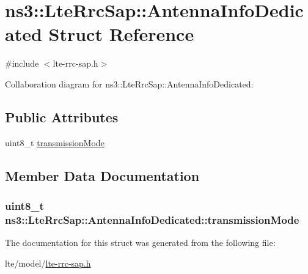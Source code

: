 \hypertarget{structns3_1_1LteRrcSap_1_1AntennaInfoDedicated}{}\section{ns3\+:\+:Lte\+Rrc\+Sap\+:\+:Antenna\+Info\+Dedicated Struct Reference}
\label{structns3_1_1LteRrcSap_1_1AntennaInfoDedicated}


{\ttfamily \#include $<$lte-\/rrc-\/sap.\+h$>$}



Collaboration diagram for ns3\+:\+:Lte\+Rrc\+Sap\+:\+:Antenna\+Info\+Dedicated\+:
\subsection*{Public Attributes}
\begin{DoxyCompactItemize}
\item 
uint8\+\_\+t \hyperlink{structns3_1_1LteRrcSap_1_1AntennaInfoDedicated_af0565283e3839265f42c75c9f5b37c8c}{transmission\+Mode}
\end{DoxyCompactItemize}


\subsection{Member Data Documentation}
\subsubsection[{\texorpdfstring{transmission\+Mode}{transmissionMode}}]{\setlength{\rightskip}{0pt plus 5cm}uint8\+\_\+t ns3\+::\+Lte\+Rrc\+Sap\+::\+Antenna\+Info\+Dedicated\+::transmission\+Mode}\hypertarget{structns3_1_1LteRrcSap_1_1AntennaInfoDedicated_af0565283e3839265f42c75c9f5b37c8c}{}\label{structns3_1_1LteRrcSap_1_1AntennaInfoDedicated_af0565283e3839265f42c75c9f5b37c8c}


The documentation for this struct was generated from the following file\+:\begin{DoxyCompactItemize}
\item 
lte/model/\hyperlink{lte-rrc-sap_8h}{lte-\/rrc-\/sap.\+h}\end{DoxyCompactItemize}
